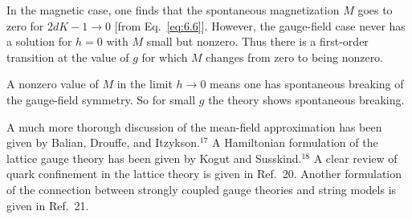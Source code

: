 In the magnetic case, one finds that the spontaneous magnetization $M$
goes to zero for $2dK-1\to0$ [from Eq.~\eqref{eq:6.6}].  However, the
gauge-field case never has a solution for $h=0$ with $M$ small but
nonzero.  Thus there is a first-order transition at the value of $g$ for
which $M$ changes from zero to being nonzero.

A nonzero value of $M$ in the limit $h\to0$ means one has spontaneous
breaking of the gauge-field symmetry.  So for small $g$ the theory shows
spontaneous breaking.

A much more thorough discussion of the mean-field approximation has been
given by Balian, Drouffe, and Itzykson.${}^{17}$  A Hamiltonian
formulation of the lattice gauge theory has been given by Kogut and
Susskind.${}^{18}$  A clear review of quark confinement in the lattice
theory is given in Ref.~20.  Another formulation of the connection
between strongly coupled gauge theories and string models is given in
Ref.~21.
